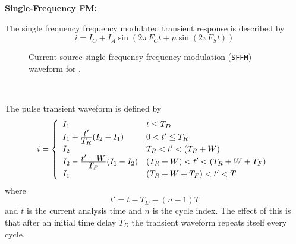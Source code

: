 \noindent\underline{\bf Single-Frequency FM:}
\\[0.2in]


The single frequency frequency modulated transient response is described by
\begin{equation}
i = I_O + I_A\sin{(2 \pi \, F_C t +  \mu\sin{(2 \pi F_S t)})}
\end{equation}
\begin{figure}[hbp]
\centering

\caption[Current source single frequency frequency modulation ({\tt SFFM})
waveform]{Current source single frequency frequency modulation ({\tt SFFM})
waveform for\newline
\hspace*{\fill}{\tt SFFM(0.2 0.7 4 0.9 1)}\hspace*{\fill}.
\label{fig:isffm}}
\end{figure}

\\[0.2in]

The pulse transient waveform is defined by
\begin{equation}
i = \left\{ \begin{array}{ll}
I_1                         & t \le T_D\\
I_1 + {{\textstyle t'} \over {\textstyle T_R}} ({I_2}-{I_1})&0<t' \le T_R\\
I_2                         &{T_R} < t'< (T_R+W)\\
I_2 - {{\textstyle t'-W} \over {\textstyle T_F}} (I_1-I_2)
                   &(T_R+W) < t' < (T_R+W+T_F)\\
I_1           &(T_R+W+T_F) < t' < T
     \end{array} \right. %
\end{equation}
where
\begin{equation}
t' = t - T_D -(n-1)T
\end{equation}
and $t$ is the current analysis time and $n$ is the cycle index.  The effect
of this is that after an initial time delay $T_D$ the transient waveform
repeats itself every cycle.

